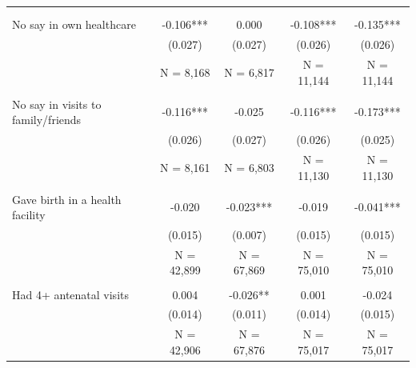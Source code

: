 \begin{tabular}{lcccc}
\toprule
 &  &  &  &  \\\\
\midrule
No say in own healthcare&-0.106***&0.000&-0.108***&-0.135***\\
&(0.027)&(0.027)&(0.026)&(0.026)\\
&N = 8,168&N = 6,817&N = 11,144&N = 11,144\\
&&&&\\
No say in visits to family/friends&-0.116***&-0.025&-0.116***&-0.173***\\
&(0.026)&(0.027)&(0.026)&(0.025)\\
&N = 8,161&N = 6,803&N = 11,130&N = 11,130\\
&&&&\\
Gave birth in a health facility&-0.020&-0.023***&-0.019&-0.041***\\
&(0.015)&(0.007)&(0.015)&(0.015)\\
&N = 42,899&N = 67,869&N = 75,010&N = 75,010\\
&&&&\\
Had 4+ antenatal visits&0.004&-0.026**&0.001&-0.024\\
&(0.014)&(0.011)&(0.014)&(0.015)\\
&N = 42,906&N = 67,876&N = 75,017&N = 75,017\\
\bottomrule
\end{tabular}
